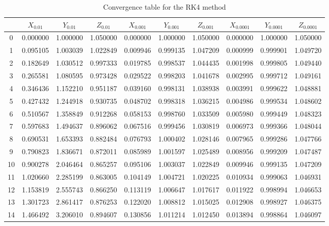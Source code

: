 \documentclass[12pt, a4paper]{article}
\begin{document}
	    
	\begin{table}[H]
		\centering
		\footnotesize %
		\begin{tabular}{|c|c|c|c|c|c|c|c|c|c|}
			\toprule
			   & $X_{0.01}$ & $Y_{0.01}$ & $Z_{0.01}$ & $X_{0.001}$ & $Y_{0.001}$ & $Z_{0.001}$ & $X_{0.0001}$ & $Y_{0.0001}$ & $Z_{0.0001}$ \\
			\midrule
			0  & 0.000000   & 1.000000   & 1.050000   & 0.000000    & 1.000000    & 1.050000    & 0.000000     & 1.000000     & 1.050000     \\
			1  & 0.095105   & 1.003039   & 1.022849   & 0.009946    & 0.999135    & 1.047209    & 0.000999     & 0.999901     & 1.049720     \\
			2  & 0.182649   & 1.030512   & 0.997333   & 0.019785    & 0.998537    & 1.044435    & 0.001998     & 0.999805     & 1.049440     \\
			3  & 0.265581   & 1.080595   & 0.973428   & 0.029522    & 0.998203    & 1.041678    & 0.002995     & 0.999712     & 1.049161     \\
			4  & 0.346436   & 1.152210   & 0.951187   & 0.039160    & 0.998131    & 1.038938    & 0.003991     & 0.999622     & 1.048881     \\
			5  & 0.427432   & 1.244918   & 0.930735   & 0.048702    & 0.998318    & 1.036215    & 0.004986     & 0.999534     & 1.048602     \\
			6  & 0.510567   & 1.358849   & 0.912268   & 0.058153    & 0.998760    & 1.033509    & 0.005980     & 0.999449     & 1.048323     \\
			7  & 0.597683   & 1.494637   & 0.896062   & 0.067516    & 0.999456    & 1.030819    & 0.006973     & 0.999366     & 1.048044     \\
			8  & 0.690531   & 1.653393   & 0.882484   & 0.076793    & 1.000402    & 1.028146    & 0.007965     & 0.999286     & 1.047766     \\
			9  & 0.790823   & 1.836671   & 0.872011   & 0.085989    & 1.001597    & 1.025489    & 0.008956     & 0.999209     & 1.047487     \\
			10 & 0.900278   & 2.046464   & 0.865257   & 0.095106    & 1.003037    & 1.022849    & 0.009946     & 0.999135     & 1.047209     \\
			11 & 1.020660   & 2.285199   & 0.863005   & 0.104149    & 1.004721    & 1.020225    & 0.010934     & 0.999063     & 1.046931     \\
			12 & 1.153819   & 2.555743   & 0.866250   & 0.113119    & 1.006647    & 1.017617    & 0.011922     & 0.998994     & 1.046653     \\
			13 & 1.301723   & 2.861417   & 0.876253   & 0.122020    & 1.008812    & 1.015025    & 0.012908     & 0.998927     & 1.046375     \\
			14 & 1.466492   & 3.206010   & 0.894607   & 0.130856    & 1.011214    & 1.012450    & 0.013894     & 0.998864     & 1.046097     \\
			\bottomrule
		\end{tabular}
		\caption{Convergence table for the RK4 method}
	\end{table}
	    
\end{document}
